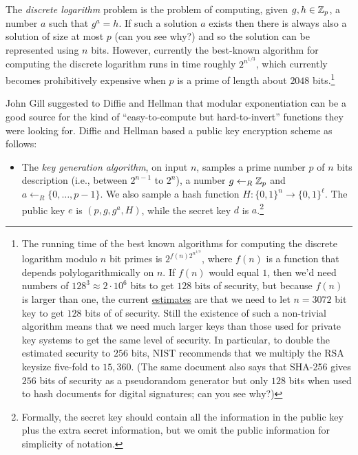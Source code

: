 The \emph{discrete logarithm} problem is the problem of computing, given
\(g,h \in {\mathbb{Z}}_p\), a number \(a\) such that \(g^a=h\). If such a solution
\(a\) exists then there is always also a solution of size at most \(p\)
(can you see why?) and so the solution can be represented using \(n\)
bits. However, currently the best-known algorithm for computing the
discrete logarithm runs in time roughly \(2^{n^{1/3}}\), which currently
becomes prohibitively expensive when \(p\) is a prime of length about
\(2048\) bits.\footnote{The running time of the best known algorithms
  for computing the discrete logarithm modulo \(n\) bit primes is
  \(2^{f(n)2^{n^{1/3}}}\), where \(f(n)\) is a function that depends
  polylogarithmically on \(n\). If \(f(n)\) would equal \(1\), then we'd
  need numbers of \(128^3 \approx 2\cdot 10^6\) bits to get \(128\) bits
  of security, but because \(f(n)\) is larger than one, the current
  \href{https://goo.gl/ntszsg}{estimates} are that we need to let
  \(n=3072\) bit key to get \(128\) bits of of security. Still the
  existence of such a non-trivial algorithm means that we need much
  larger keys than those used for private key systems to get the same
  level of security. In particular, to double the estimated security to
  \(256\) bits, NIST recommends that we multiply the RSA keysize
  five-fold to \(15,360\). (The same document also says that SHA-256
  gives \(256\) bits of security as a pseudorandom generator but only
  \(128\) bits when used to hash documents for digital signatures; can
  you see why?)}

John Gill suggested to Diffie and Hellman that modular exponentiation
can be a good source for the kind of ``easy-to-compute but
hard-to-invert'' functions they were looking for. Diffie and Hellman
based a public key encryption scheme as follows:

\begin{itemize}
\tightlist
\item
  The \emph{key generation algorithm}, on input \(n\), samples a prime
  number \(p\) of \(n\) bits description (i.e., between \(2^{n-1}\) to
  \(2^n\)), a number \(g\leftarrow_R {\mathbb{Z}}_p\) and
  \(a \leftarrow_R \{0,\ldots,p-1\}\). We also sample a hash function
  \(H:\{0,1\}^n\rightarrow\{0,1\}^\ell\). The public key \(e\) is
  \((p,g,g^a,H)\), while the secret key \(d\) is \(a\).\footnote{Formally,
    the secret key should contain all the information in the public key
    plus the extra secret information, but we omit the public
    information for simplicity of notation.}
\end{itemize}

